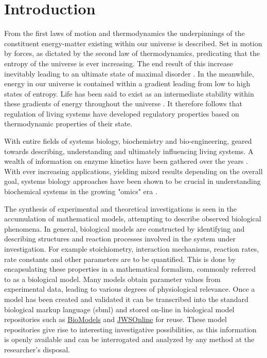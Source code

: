 \chapter{Introduction} \label{chp:1}
From the first laws of motion and thermodynamics the underpinnings of the constituent energy-matter existing within our universe is described. Set in motion by forces, as dictated by the second law of thermodynamics, predicating that the entropy of the universe is ever increasing. The end result of this increase inevitably leading to an ultimate state of maximal disorder \cite{Planck1905}. In the meanwhile, energy in our universe is contained within a gradient leading from low to high states of entropy. Life has been said to exist as an intermediate stability within these gradients of energy throughout the universe \cite{Schneider1994, Prigogine1998}. It therefore follows that regulation of living systems have developed regulatory properties based on thermodynamic properties of their state. 

With entire fields of systems biology, biochemistry and bio-engineering, geared towards describing, understanding and ultimately influencing living systems. A wealth of information on enzyme kinetics have been gathered over the years \cite{Boogerd2007, Khalil2015}. With ever increasing applications, yielding mixed results depending on the overall goal, systems biology approaches have been shown to be crucial in understanding biochemical systems in the growing "omics" era  \cite{Kell2006, Ho2008, Knudsen2004, Bleicher2003, Steuer2003}. 

The synthesis of experimental and theoretical investigations is seen in the accumulation of mathematical models, attempting to describe observed biological phenomena. In general, biological models are constructed by identifying and describing structures and reaction processes involved in the system under investigation. For example stoichiometry, interaction mechanisms, reaction rates, rate constants and other parameters are to be quantified. This is done by encapsulating these properties in a mathematical formalism, commonly referred to as a biological model. Many models obtain parameter values from experimental data, leading to various degrees of physiological relevance. Once a model has been created and validated it can be transcribed into the standard biological markup language (\gls{sbml}) and stored on-line in biological model repositories such as \href{https://www.ebi.ac.uk/biomodels-main/}{BioModels} and \href{https://jjj.bio.vu.nl}{JWSOnline} for reuse. These model repositories give rise to interesting investigative possibilities, as this information is openly available and can be interrogated and analyzed by any method at the researcher's disposal. 

